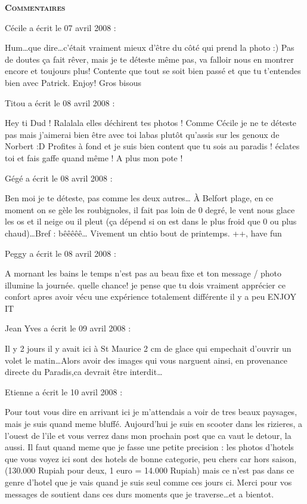 \bigskip
\textbf{\textsc{Commentaires}}

\medskip
Cécile a écrit le 07 avril 2008 :
\begin{displayquote}
Hum\dots que dire\dots c'était vraiment mieux d'être du côté qui prend la photo :) Pas de doutes ça fait rêver, mais je te déteste même pas, va falloir nous en montrer encore et toujours plus!
Contente que tout se soit bien passé et que tu t'entendes bien avec Patrick. Enjoy!
Gros bisous
\end{displayquote}

\medskip
Titou a écrit le 08 avril 2008 :
\begin{displayquote}
Hey ti Dud !
Ralalala elles déchirent tes photos ! Comme Cécile je ne te déteste pas mais j'aimerai bien être avec toi labas plutôt qu'assis sur les genoux de Norbert :D
Profites à fond et je suis bien content que tu sois au paradis ! éclates toi et fais gaffe quand même !
A plus mon pote !
\end{displayquote}

\medskip
Gégé a écrit le 08 avril 2008 :
\begin{displayquote}
Ben moi je te déteste, pas comme les deux autres\dots
À Belfort plage, en ce moment on se gèle les roubignoles, il fait pas loin de 0 degré, le vent nous glace les os et il neige ou il pleut (ça dépend si on est dans le plus froid que 0 ou plus chaud)\dots Bref : bêêêêê\dots
Vivement un chtio bout de printemps.
++, have fun
\end{displayquote}

\medskip
Peggy a écrit le 08 avril 2008 :
\begin{displayquote}
A mornant les bains le temps n'est pas au beau fixe et ton message / photo illumine la journée.
quelle chance!
je pense que tu dois vraiment apprécier ce confort apres avoir vécu une expérience totalement différente il y a peu
ENJOY IT
\end{displayquote}

\medskip
Jean Yves  a écrit le 09 avril 2008 :
\begin{displayquote}
Il y 2 jours il y avait ici à St Maurice 2 cm de glace qui empechait d'ouvrir un volet le matin\dots Alors avoir des images qui vous narguent ainsi, en provenance directe du Paradis,ca devrait être interdit\dots
\end{displayquote}

\medskip
Etienne a écrit le 10 avril 2008 :
\begin{displayquote}
Pour tout vous dire en arrivant ici je m'attendais a voir de tres beaux paysages, mais je suis quand meme bluffé.
Aujourd'hui je suis en scooter dans les rizieres, a l'ouest de l'ile et vous verrez dans mon prochain post que ca vaut le detour, la aussi.
Il faut quand meme que je fasse une petite precision : les photos d'hotels que vous voyez ici sont des hotels de bonne categorie, peu chers car hors saison, (130.000 Rupiah pour deux, 1 euro = 14.000 Rupiah) mais ce n'est pas dans ce genre d'hotel que je vais quand je suis seul comme ces jours ci.
Merci pour vos messages de soutient dans ces durs moments que je traverse\dots et a bientot.
\end{displayquote}

